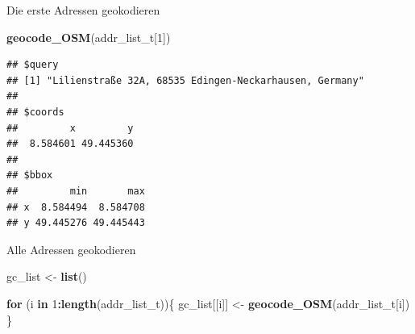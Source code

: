 \documentclass[ignorenonframetext,]{beamer}
\newenvironment{Shaded}{\begin{snugshade}}{\end{snugshade}}
\newcommand{\KeywordTok}[1]{\textcolor[rgb]{0.13,0.29,0.53}{\textbf{#1}}}
\newcommand{\DecValTok}[1]{\textcolor[rgb]{0.00,0.00,0.81}{#1}}
\newcommand{\StringTok}[1]{\textcolor[rgb]{0.31,0.60,0.02}{#1}}
\newcommand{\ControlFlowTok}[1]{\textcolor[rgb]{0.13,0.29,0.53}{\textbf{#1}}}
\newcommand{\OperatorTok}[1]{\textcolor[rgb]{0.81,0.36,0.00}{\textbf{#1}}}
\newcommand{\NormalTok}[1]{#1}
\begin{document}
\begin{frame}[fragile]{Die erste Adressen geokodieren}

\begin{Shaded}
\begin{Highlighting}[]
\KeywordTok{geocode_OSM}\NormalTok{(addr_list_t[}\DecValTok{1}\NormalTok{])}
\end{Highlighting}
\end{Shaded}

\begin{verbatim}
## $query
## [1] "Lilienstraße 32A, 68535 Edingen-Neckarhausen, Germany"
## 
## $coords
##         x         y 
##  8.584601 49.445360 
## 
## $bbox
##         min       max
## x  8.584494  8.584708
## y 49.445276 49.445443
\end{verbatim}

\end{frame}

\begin{frame}[fragile]{Alle Adressen geokodieren}

\begin{Shaded}
\begin{Highlighting}[]
\NormalTok{gc_list <-}\StringTok{ }\KeywordTok{list}\NormalTok{()}

\ControlFlowTok{for}\NormalTok{ (i }\ControlFlowTok{in} \DecValTok{1}\OperatorTok{:}\KeywordTok{length}\NormalTok{(addr_list_t))\{}
\NormalTok{  gc_list[[i]] <-}\StringTok{ }\KeywordTok{geocode_OSM}\NormalTok{(addr_list_t[i])}
\NormalTok{\}}
\end{Highlighting}
\end{Shaded}

\end{frame}
\end{document}
